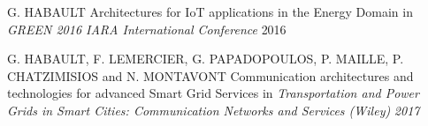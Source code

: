 \documentclass[11pt, a4paper]{awesome-cv}
\begin{document}
\begin{cvhonors}
  \cvpublication
  	{}
    {G. HABAULT}
    {Architectures for IoT applications in the Energy Domain}
    {in \textit{GREEN 2016 IARA International Conference}}
    {2016}
\end{cvhonors}

\begin{cvhonors}
  \cvpublication
  	{}
    {G. HABAULT, F. LEMERCIER, G. PAPADOPOULOS, P. MAILLE, P. CHATZIMISIOS and N. MONTAVONT}
    {Communication architectures and technologies for advanced Smart Grid Services}
    {in \textit{Transportation and Power Grids in Smart Cities: Communication Networks and Services (Wiley)}}
    {\textit{2017}}
\end{cvhonors}
\end{document}
